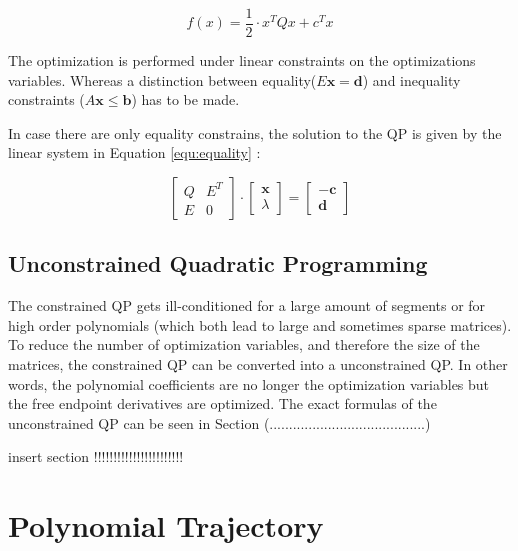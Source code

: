 \begin{equation}
 f(x)  = \frac{1}{2} \cdot x^T Q x + c^T x 
\label{equ:quadratic}
\end{equation}

The optimization is performed under linear constraints on the optimizations variables. Whereas a distinction between equality($ E\mathbf{x} = \mathbf d $) and inequality constraints ($ A\mathbf{x} \leq \mathbf b $) has to be made. 

In case there are only equality constrains, the solution to the QP is given by the linear system in Equation \ref{equ:equality} :


\begin{equation}
\begin{bmatrix}
   Q & E^T \\
   E & 0
\end{bmatrix} 
\cdot
\begin{bmatrix}
   \mathbf x \\
   \lambda
\end{bmatrix}
= 
\begin{bmatrix}
   -\mathbf c \\
   \mathbf d
\end{bmatrix}
\label{equ:equality}
\end{equation}



\subsection{Unconstrained Quadratic Programming}
The constrained QP gets ill-conditioned for a large amount of segments or for high order polynomials (which both lead to large and sometimes sparse matrices). 
To reduce the number of optimization variables, and therefore the size of the matrices, the constrained QP can be converted into a unconstrained QP. \newline
In other words, the polynomial coefficients are no longer the optimization variables but the free endpoint derivatives are optimized. The exact formulas of the unconstrained QP can be seen in Section (........................................) \newline

insert section !!!!!!!!!!!!!!!!!!!!!!!




\section{Polynomial Trajectory}\label{sec:polynomial}

